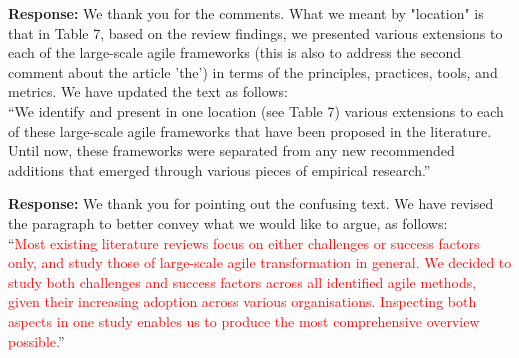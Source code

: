 \documentclass[a4paper,twoside,11pt]{reviewresponse}
\begin{document}
\textbf{Response:}
We thank you for the comments. What we meant by "location" is that in Table 7, based on the review findings, we presented various extensions to each of the large-scale agile frameworks (this is also to address the second comment about the article 'the') in terms of the principles, practices, tools, and metrics. We have updated the text as follows: \\
``We identify and present in one location (see Table 7) various extensions to each of these large-scale agile frameworks that have been proposed in the literature. Until now, these frameworks were separated from any new recommended additions that emerged through various pieces of empirical research.''


\textbf{Response:}
We thank you for pointing out the confusing text. We have revised the paragraph to better convey what we would like to argue, as follows:\\
``\textcolor{red}{Most existing literature reviews focus on either challenges or success factors only, and study those of large-scale agile transformation in general. We decided to study both challenges and success factors across all identified agile methods, given their increasing adoption across various organisations. Inspecting both aspects in one study enables us to produce the most comprehensive overview possible.}''
\end{document}
